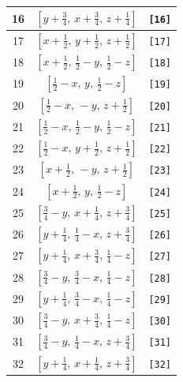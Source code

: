 \documentclass[fleqn,8pt]{jsarticle}
\begin{document}
\begin{longtable}{ccc}
16 & $\left[ y + \frac{3}{4},\, x + \frac{3}{4},\, z + \frac{1}{4} \right]$ & {\tt [16]} \\ \hline
17 & $\left[ x + \frac{1}{2},\, y + \frac{1}{2},\, z + \frac{1}{2} \right]$ & {\tt [17]} \\ \hline
18 & $\left[ x + \frac{1}{2},\, \frac{1}{2} - y,\, \frac{1}{2} - z \right]$ & {\tt [18]} \\ \hline
19 & $\left[ \frac{1}{2} - x,\, y,\, \frac{1}{2} - z \right]$ & {\tt [19]} \\ \hline
20 & $\left[ \frac{1}{2} - x,\, - y,\, z + \frac{1}{2} \right]$ & {\tt [20]} \\ \hline
21 & $\left[ \frac{1}{2} - x,\, \frac{1}{2} - y,\, \frac{1}{2} - z \right]$ & {\tt [21]} \\ \hline
22 & $\left[ \frac{1}{2} - x,\, y + \frac{1}{2},\, z + \frac{1}{2} \right]$ & {\tt [22]} \\ \hline
23 & $\left[ x + \frac{1}{2},\, - y,\, z + \frac{1}{2} \right]$ & {\tt [23]} \\ \hline
24 & $\left[ x + \frac{1}{2},\, y,\, \frac{1}{2} - z \right]$ & {\tt [24]} \\ \hline
25 & $\left[ \frac{3}{4} - y,\, x + \frac{1}{4},\, z + \frac{3}{4} \right]$ & {\tt [25]} \\ \hline
26 & $\left[ y + \frac{1}{4},\, \frac{1}{4} - x,\, z + \frac{3}{4} \right]$ & {\tt [26]} \\ \hline
27 & $\left[ y + \frac{1}{4},\, x + \frac{3}{4},\, \frac{1}{4} - z \right]$ & {\tt [27]} \\ \hline
28 & $\left[ \frac{3}{4} - y,\, \frac{3}{4} - x,\, \frac{1}{4} - z \right]$ & {\tt [28]} \\ \hline
29 & $\left[ y + \frac{1}{4},\, \frac{3}{4} - x,\, \frac{1}{4} - z \right]$ & {\tt [29]} \\ \hline
30 & $\left[ \frac{3}{4} - y,\, x + \frac{3}{4},\, \frac{1}{4} - z \right]$ & {\tt [30]} \\ \hline
31 & $\left[ \frac{3}{4} - y,\, \frac{1}{4} - x,\, z + \frac{3}{4} \right]$ & {\tt [31]} \\ \hline
32 & $\left[ y + \frac{1}{4},\, x + \frac{1}{4},\, z + \frac{3}{4} \right]$ & {\tt [32]} \\
\end{longtable}
\end{document}
